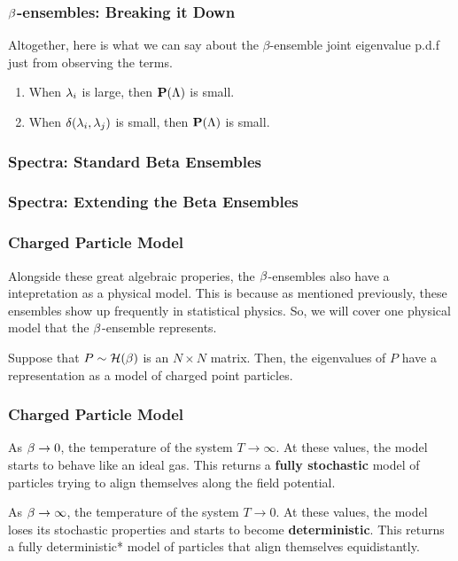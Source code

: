 \begin{frame} \frametitle{$\beta$-ensembles: Breaking it Down}
  Altogether, here is what we can say about the $\beta$-ensemble joint eigenvalue p.d.f just from observing the terms.
    \begin{enumerate}
      \item When $\lambda_i$ is large, then $\textbf{P}(\Lambda)$ is small.
      \item When $\delta(\lambda_i, \lambda_j)$ is small, then $\textbf{P}(\Lambda)$ is small.
    \end{enumerate}
\end{frame}
\begin{frame} \frametitle{Spectra: Standard Beta Ensembles}
\end{frame}
\begin{frame} \frametitle{Spectra: Extending the Beta Ensembles}
\end{frame}
\begin{frame} \frametitle{Charged Particle Model}

  Alongside these great algebraic properies, the $\beta$-ensembles also have a intepretation as a physical model.
  This is because as mentioned previously, these ensembles show up frequently in statistical physics.
  So, we will cover one physical model that the $\beta$-ensemble represents.

  Suppose that $P \sim \mathcal{H}(\beta)$ is an $N \times N$ matrix. Then, the eigenvalues of $P$ have a representation as a model of charged point particles.

\end{frame}
\begin{frame} \frametitle{Charged Particle Model}
   As $\beta \to 0$, the temperature of the system $T \to \infty$.
  At these values, the model starts to behave like an ideal gas.
   This returns a \textbf{fully stochastic} model of particles trying to align themselves along the field potential.

   As $\beta \to \infty$, the temperature of the system $T \to 0$.
  At these values, the model loses its stochastic properties and starts to become \textbf{deterministic}. This returns a fully deterministic*
  model of particles that align themselves equidistantly.

\end{frame}
